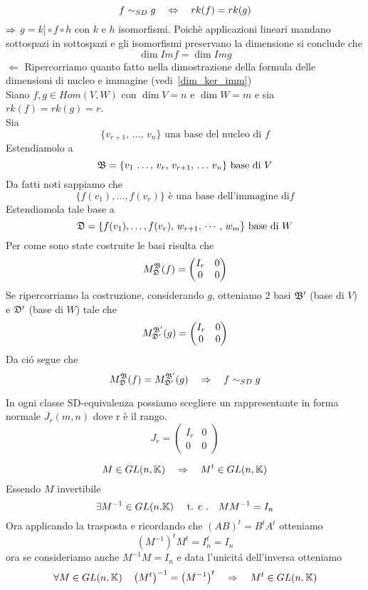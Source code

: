 \begin{prop}
$$ f\sim_{SD} g \quad \Leftrightarrow \quad rk (f) =rk(g)  $$
\proof $\Rightarrow$ $g=k ]\circ f \circ h $ con $k$ e $h$ isomorfismi.
Poich\`e applicazioni lineari mandano sottospazi in sottospazi e  gli isomorfismi preservano la dimensione si conclude che 
$$ \dim Im f = \dim Im g$$
$\Leftarrow$ Ripercorriamo quanto fatto nella dimostrazione della formula delle dimensioni di nucleo e immagine (vedi~\ref{dim_ker_imm})\\
Siano $f, g \in Hom(V,W) $ con $\dim V = n $ e $\dim W =m $ e sia $ rk(f)=rk(g)=r$.\\
Sia $$\{  v_{r+1}, \, \dots , \, v_n \} \text{ una base del nucleo di } f $$
Estendiamolo a $$\mathfrak{B}= \{ v_1 \, \dots , \, v_r, \, v_{r+1}, \, \dots \, v_n \} \text{ base di } V$$
Da fatti noti sappiamo che  $$ \{ f(v_1), \dots, f(v_r)  \} \text{ \`e una base  dell'immagine di} f $$
Estendiamola tale base a 
$$\mathfrak{D}=\{ f(v_1), \dots , f(v_r) , \, w_{r+1}, \, \cdots , \, w_m \} \text{  base di } W$$
Per come sono state costruite le basi risulta che
$$M_{\mathfrak{D}} ^{\mathfrak{B}} (f)= \begin{pmatrix}
I_r & 0 \\
0 & 0 
\end{pmatrix}$$
Se ripercorriamo la costruzione, considerando $g$, otteniamo 2 basi $\mathfrak{B}' $ (base di $V$) e $\mathfrak{D}' $ (base di $W$) tale che   
$$ M_{\mathfrak{D}'}^ { \mathfrak{B} ' }(g)= \begin{pmatrix}
I_r & 0 \\
0 & 0 
\end{pmatrix}$$
Da ci\'o segue che
$$M_{\mathfrak{D}} ^{\mathfrak{B}} (f)=M_{\mathfrak{D}'}^ { \mathfrak{B} ' }(g)\quad \Rightarrow \quad f\sim_{SD} g $$
\endproof

\begin{oss}
In ogni classe SD-equivalenza possiamo scegliere un rappresentante in forma normale $ J_r (m,n)$ dove r è il rango.\\
$$
J_r=
\left(
\begin{array}{c|c}
I_r & 0 \\
\hline
0 & 0
\end{array}
\right)
$$

\end{oss}
\end{prop}
\newpage
\begin{lem}
$$ M \in GL(n,\mathbb{K}) \quad \Rightarrow \quad M^t \in GL(n,\mathbb{K})$$
\proof
Essendo $M$ invertibile 
$$ \exists M^{-1}\in GL(n.\mathbb{K}) \quad \text{ t. c .} \quad M M^{-1} =I_n $$ 
Ora applicando la trasposta e ricordando che $(AB)^t = B^t A^t $ otteniamo 
$$ \left( M^{-1} \right)^t M^t = I_n^t =I_n$$ 
ora se consideriamo anche $M^{-1}M=I_n$ e data l'unicit\'a dell'inversa otteniamo
$$ \forall M \in GL(n, \mathbb{K}) \quad \left( M^t \right)^{-1}= \left(M^{-1}\right)^t \quad \Rightarrow \quad M^t \in GL(n,\mathbb{K})$$
\endproof
\end{lem}
